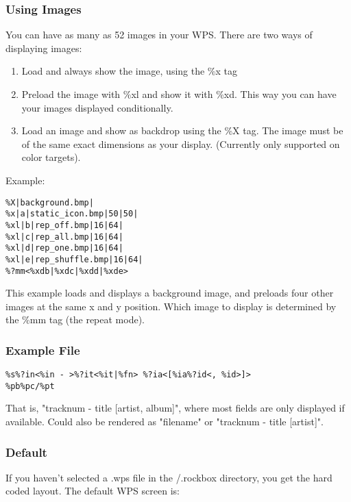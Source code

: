\subsubsection{Using Images}
You can have as many as 52 images in your WPS. There are two ways of displaying images:
\begin{enumerate}
  \item Load and always show the image, using the \%x tag
  \item Preload the image with \%xl and show it with \%xd. This way you can have your images displayed conditionally.
  \item Load an image and show as backdrop using the \%X tag. The image must be of the same exact dimensions as your display. (Currently only supported on color targets).
\end{enumerate}
Example:
\begin{verbatim}
%X|background.bmp|
%x|a|static_icon.bmp|50|50|
%xl|b|rep_off.bmp|16|64|
%xl|c|rep_all.bmp|16|64|
%xl|d|rep_one.bmp|16|64|
%xl|e|rep_shuffle.bmp|16|64|
%?mm<%xdb|%xdc|%xdd|%xde>
\end{verbatim}
This example loads and displays a background image, and preloads four other images at the same x and y position. Which image to display is determined by the \%mm tag (the repeat mode).

\subsubsection{Example File}
\begin{verbatim}
%s%?in<%in - >%?it<%it|%fn> %?ia<[%ia%?id<, %id>]>
%pb%pc/%pt
\end{verbatim}
That is, "tracknum - title [artist, album]", where most fields are only displayed if available. Could also be rendered as "filename" or "tracknum - title [artist]".

\subsubsection{Default}
If you haven't selected a .wps file in the /.rockbox
directory, you get the hard coded layout. The default WPS screen is:


